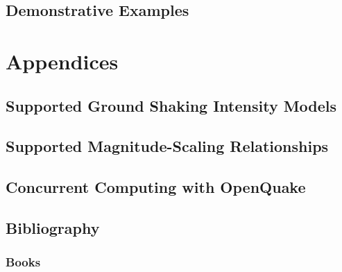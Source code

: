 \documentclass[11pt,fleqn]{book} %
\begin{document}
\chapter{Demonstrative Examples}
	\label{chap:riskexamples}
	
   \cleardoublepage

\thispagestyle{empty}
\part*{Appendices}
\appendix

\chapter{Supported Ground Shaking Intensity Models}
	
   \cleardoublepage

\chapter{Supported Magnitude-Scaling Relationships}
	
   \cleardoublepage

\chapter{Concurrent Computing with OpenQuake}
   \label{chap:concurrent_tasks}
   
   \cleardoublepage


\chapter*{Bibliography}
\section*{Books}
\printbibliography[heading=bibempty,type=book]
\end{document}
